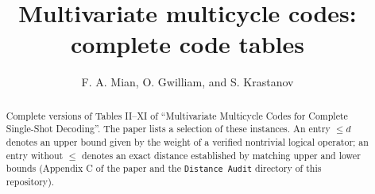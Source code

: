 \documentclass[%
 reprint,
 superscriptaddress, 
 amsmath,amssymb,
 aps,
 pra,
 floatfix,
]{revtex4-2}
\theoremstyle{definition}
\theoremstyle{definition}
\begin{document}
\title{Multivariate multicycle codes: complete code tables}
\author{F. A. Mian, O. Gwilliam, and S. Krastanov}
\begin{abstract}
Complete versions of Tables II--XI of ``Multivariate Multicycle Codes for Complete Single-Shot Decoding''. The paper lists a selection of these instances. An entry $\leq d$ denotes an upper bound given by the weight of a verified nontrivial logical operator; an entry without $\leq$ denotes an exact distance established by matching upper and lower bounds (Appendix C of the paper and the \texttt{Distance Audit} directory of this repository).
\end{abstract}
\maketitle
\setcounter{table}{1}
\clearpage
\onecolumngrid
{}
\clearpage
\onecolumngrid
\end{document}

